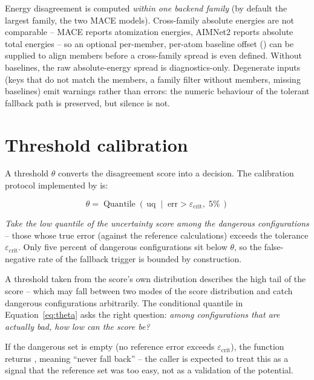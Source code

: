 Energy disagreement is computed \emph{within one backend family} (by
default the largest family, the two MACE models).  Cross-family absolute
energies are not comparable -- MACE reports atomization energies, AIMNet2
reports absolute total energies -- so an optional per-member, per-atom
baseline offset () can be supplied to align members
before a cross-family spread is even defined.  Without baselines, the raw
absolute-energy spread is diagnostics-only.  Degenerate inputs (keys that do
not match the members, a family filter without members, missing baselines)
emit  warnings rather than errors: the numeric behaviour of
the tolerant fallback path is preserved, but silence is not.

\section{Threshold calibration}

A threshold $\theta$ converts the disagreement score into a decision.  The
calibration protocol implemented by  is:

\begin{equation}
  \theta = \operatorname{Quantile}\!\left(\,
      \mathrm{uq} \;\middle|\; \mathrm{err} > \varepsilon_{\mathrm{crit}},
      \; 5\% \,\right)
  \label{eq:theta}
\end{equation}

\emph{Take the low quantile of the uncertainty score among the dangerous
configurations} -- those whose true error (against the reference
calculations) exceeds the tolerance $\varepsilon_{\mathrm{crit}}$.  Only
five percent of dangerous configurations sit below $\theta$, so the
false-negative rate of the fallback trigger is bounded by construction.

\begin{notebox}
A threshold taken from the score's own distribution describes the high tail
of the score -- which may fall between two modes of the score distribution
and catch dangerous configurations arbitrarily.  The conditional quantile in
Equation~\ref{eq:theta} asks the right question: \emph{among configurations
that are actually bad, how low can the score be?}
\end{notebox}

If the dangerous set is empty (no reference error exceeds
$\varepsilon_{\mathrm{crit}}$), the function returns , meaning
``never fall back'' -- the caller is expected to treat this as a signal that
the reference set was too easy, not as a validation of the potential.

